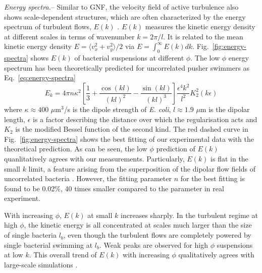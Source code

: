 \documentclass[twocolumn,aps,prl,amsmath,amssymb,longbibliography]{revtex4-2}
\begin{document}
\textit{Energy spectra.}--
Similar to GNF, the velocity field of active turbulence also shows scale-dependent structures, which are often characterized by the energy spectrum of turbulent flows, $E(k)$ \cite{Liu2020}. $E(k)$ measures the kinetic energy density at different scales in terms of wavenumber $k = 2\pi/l$. It is related to the mean kinetic energy density $E = \langle v_x^2 + v_y^2 \rangle/2$ via $E = \int_0^\infty E(k)dk$. Fig.~\ref{fig:energy-spectra} shows $E(k)$ of bacterial suspensions at different $\phi$. The low $\phi$ energy spectrum has been theoretically predicted for uncorrelated pusher swimmers \cite{Bardfalvy2019} as Eq.~\ref{eq:energy-spectra}
\begin{equation}
\label{eq:energy-spectra}
E_k = 4\pi n \kappa^2 \left[ \frac{1}{3} + \frac{\cos(kl)}{(kl)^2} - \frac{\sin(kl)}{(kl)^3} \right] \frac{\epsilon^4k^2}{l^2} K_2^2(k\epsilon)
\end{equation}
where  $\kappa \approx 400$ $\mu$m$^3$/s is the dipole strength of \textit{E. coli}, $l\approx 1.9$ $\mu$m is the dipolar length, $\epsilon$ is a factor describing the distance over which the regularisation acts and $K_2$ is the modified Bessel function of the second kind. The red dashed curve in Fig.~\ref{fig:energy-spectra} shows the best fitting of our experimental data with the theoretical prediction. As can be seen, the low $\phi$ prediction of $E(k)$ quanlitatively agrees with our measurements.
Particularly, $E(k)$ is flat in the small $k$ limit, a feature arising from the superposition of the dipolar flow fields of uncorrelated bacteria \cite{Bardfalvy2019}. However, the fitting parameter $n$ for the best fitting is found to be 0.02\%, 40 times smaller compared to the parameter in real experiment. %

With increasing $\phi$, $E(k)$ at small $k$ increases sharply. In the turbulent regime at high $\phi$, the kinetic energy is all concentrated at scales much larger than the size of single bacteria $l_b$, even though the turbulent flows are completely powered by single bacterial swimming at $l_b$. %
Weak peaks are observed for high $\phi$ suspensions at low $k$. This overall trend of $E(k)$ with increasing $\phi$ qualitatively agrees with large-scale simulations \cite{Saintillan2012,Bardfalvy2019}.
\end{document}

